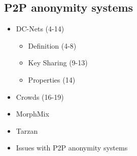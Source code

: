 \documentclass[../overview.tex]{subfiles}
\begin{document}
\subsection{P2P anonymity systems}
\begin{itemize}
	\item DC-Nets (4-14)
			\begin{itemize}
					\item Definition (4-8)
					\item Key Sharing (9-13) 
					\item Properties (14)
			\end{itemize}
	\item Crowds (16-19) 
	\item MorphMix
	\item Tarzan
	\item Issues with P2P anonymity systems
\end{itemize}
\end{document}
